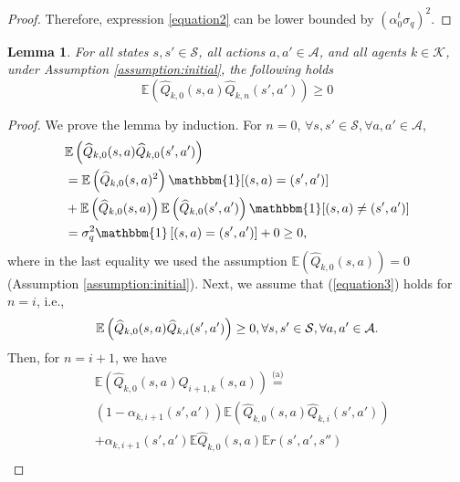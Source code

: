 \documentclass[lettersize,journal]{IEEEtran}
\newtheorem{lemma}{Lemma}
\begin{document}
\begin{appendices}
\begin{proof}
Therefore, expression \eqref{equation2}  can be lower bounded by $(\alpha_0^t\sigma_q)^2$.
\end{proof}
\begin{lemma}
\label{lemma4}
For all states $s,s'  \in \mathcal{S}$, all actions $ a,a' \in \mathcal{A}$, and all agents $k \in \mathcal{K}$, under Assumption \ref{assumption:initial}, the following holds
\begin{equation}
\label{equation3}
     \mathbb{E}\left(\widehat{Q}_{k,0}(s,a)  \widehat{Q}_{k,n}(s',a')\right) \geq 0
\end{equation}
\end{lemma}
\begin{proof}
We prove the lemma by induction. For $n=0$, $\forall s,s' \in \mathcal{S}, \forall a,a' \in \mathcal{A}$,
\begin{align}
    &\mathbb{E}\left(\widehat{Q}_{k,0}(s,a)  \widehat{Q}_{k,0}(s',a')\right)\nonumber\\
    &=\mathbb{E}\left(\widehat{Q}_{k,0}(s,a)^2\right)\mathbbm{1}[(s,a)=(s',a')]\nonumber\\
    &+\mathbb{E}\left(\widehat{Q}_{k,0}(s,a)\right)\mathbb{E}\left(\widehat{Q}_{k,0}(s',a')\right)\mathbbm{1}[(s,a)\neq(s',a')]\nonumber\\
    &=\sigma_q^2\mathbbm{1}\left[(s,a)=(s',a')\right]+0\geq 0, 
\end{align}
where in the last equality we used the assumption $\mathbb{E}\left(\widehat{Q}_{k,0}(s,a)\right)=0$ (Assumption \ref{assumption:initial}). Next, we assume that (\ref{equation3}) holds for $n=i$, i.e.,
\begin{equation}
\label{eq:induction}
     \mathbb{E}\left(\widehat{Q}_{k,0}(s,a)  \widehat{Q}_{k,i}(s',a')\right) \geq 0, \\ \forall s,s' \in \mathcal{S}, \forall a,a' \in \mathcal{A}.
\end{equation}
Then, for $n=i+1$,  we have
\begin{align}
   & \mathbb{E}\left(\widehat{Q}_{k,0}(s,a)  \widehat{Q}_{i+1,k}(s,a)\right)\stackrel{\text{(a)}}{=} \nonumber \\
   &(1-\alpha_{k,i+1}(s',a')) \mathbb{E}\left(\widehat{Q}_{k,0}(s,a)  \widehat{Q}_{k,i}(s',a') \right) \nonumber\\
   &+\alpha_{k,i+1}(s',a')\mathbb{E}\widehat{Q}_{k,0}(s,a)  \mathbb{E}r(s',a',s'') \nonumber\\

\end{align}
\end{proof}
\end{appendices}
\end{document}
